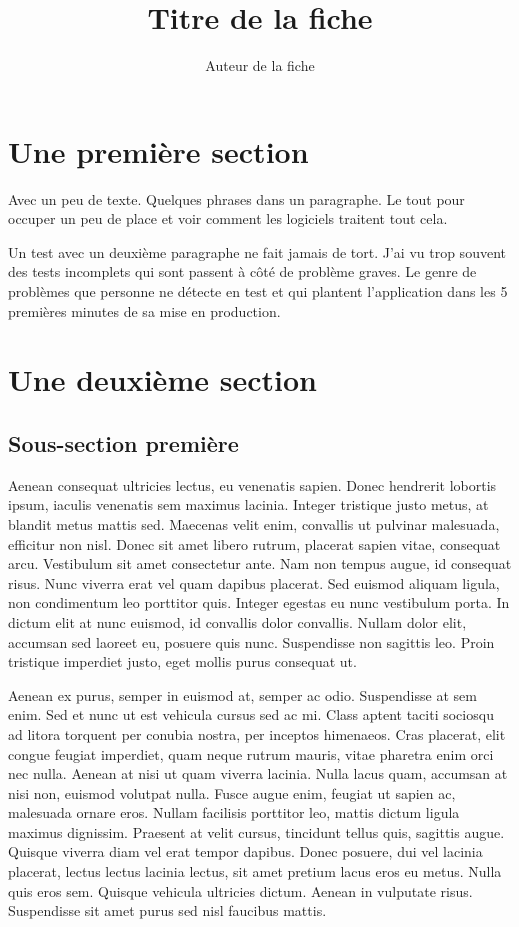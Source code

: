 \documentclass{heh-fiche}
\title{Titre de la fiche}
\author{Auteur de la fiche}
\begin{document}
\maketitle{}

\section{Une première section}

Avec un peu de texte.
Quelques phrases dans un paragraphe.
Le tout pour occuper un peu de place et voir comment les logiciels traitent tout cela.

Un test avec un deuxième paragraphe ne fait jamais de tort.
J'ai vu trop souvent des tests incomplets qui sont passent à côté de problème graves.
Le genre de problèmes que personne ne détecte en test et qui plantent l'application dans les 5 premières minutes de sa mise en production.

\section{Une deuxième section}

\subsection{Sous-section première}

Aenean consequat ultricies lectus, eu venenatis sapien. Donec hendrerit lobortis ipsum, iaculis venenatis sem maximus lacinia. Integer tristique justo metus, at blandit metus mattis sed. Maecenas velit enim, convallis ut pulvinar malesuada, efficitur non nisl. Donec sit amet libero rutrum, placerat sapien vitae, consequat arcu. Vestibulum sit amet consectetur ante. Nam non tempus augue, id consequat risus. Nunc viverra erat vel quam dapibus placerat. Sed euismod aliquam ligula, non condimentum leo porttitor quis. Integer egestas eu nunc vestibulum porta. In dictum elit at nunc euismod, id convallis dolor convallis. Nullam dolor elit, accumsan sed laoreet eu, posuere quis nunc. Suspendisse non sagittis leo. Proin tristique imperdiet justo, eget mollis purus consequat ut.

Aenean ex purus, semper in euismod at, semper ac odio. Suspendisse at sem enim. Sed et nunc ut est vehicula cursus sed ac mi. Class aptent taciti sociosqu ad litora torquent per conubia nostra, per inceptos himenaeos. Cras placerat, elit congue feugiat imperdiet, quam neque rutrum mauris, vitae pharetra enim orci nec nulla. Aenean at nisi ut quam viverra lacinia. Nulla lacus quam, accumsan at nisi non, euismod volutpat nulla. Fusce augue enim, feugiat ut sapien ac, malesuada ornare eros. Nullam facilisis porttitor leo, mattis dictum ligula maximus dignissim. Praesent at velit cursus, tincidunt tellus quis, sagittis augue. Quisque viverra diam vel erat tempor dapibus. Donec posuere, dui vel lacinia placerat, lectus lectus lacinia lectus, sit amet pretium lacus eros eu metus. Nulla quis eros sem. Quisque vehicula ultricies dictum. Aenean in vulputate risus. Suspendisse sit amet purus sed nisl faucibus mattis.
\end{document}
